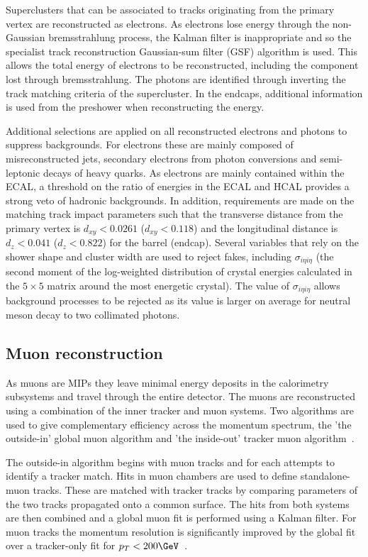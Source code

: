 Superclusters that can be associated to tracks originating from the primary vertex are reconstructed as electrons.
As electrons lose energy through the non-Gaussian bremsstrahlung process, the Kalman filter is inappropriate and
so the specialist track reconstruction Gaussian-sum filter (GSF) algorithm is used. This allows the total energy of
electrons to be reconstructed, including the component lost through bremsstrahlung. The photons are identified 
through inverting the track matching criteria of the supercluster. In the endcaps, additional information
is used from the preshower when reconstructing the energy.

Additional selections are applied on all reconstructed electrons and photons to suppress backgrounds.
For electrons these are mainly composed of misreconstructed jets, secondary electrons from photon
conversions and semi-leptonic decays of heavy quarks. As electrons are mainly contained within 
the ECAL, a threshold on the ratio of energies in the ECAL and HCAL provides a strong veto of hadronic
backgrounds. In addition, requirements are made on the matching track impact
parameters such that the transverse distance from the primary vertex is $d_{xy} < 0.0261$ ($d_{xy} < 0.118$) 
and the longitudinal distance is $d_z < 0.041$ ($d_z < 0.822$) for the barrel (endcap). 
Several variables that rely on the shower shape and cluster width are used to
reject fakes, including $\sigma_{i\eta i\eta}$ (the second moment of the log-weighted
distribution of crystal energies calculated in the $5\times5$ matrix around the
most energetic crystal). The value of $\sigma_{i\eta i\eta}$ allows background
processes to be rejected as its value is larger on average for neutral meson decay to two collimated photons.

\subsection{Muon reconstruction}
\label{sec:muon_reco}

As muons are MIPs they leave minimal energy deposits in the calorimetry
subsystems and travel through the entire detector. The muons are reconstructed using a 
combination of the inner tracker and muon systems. Two algorithms are used to 
give complementary efficiency across the momentum spectrum, the 'the outside-in' 
global muon algorithm and 'the inside-out' tracker muon algorithm~\cite{muon_reco}.

The outside-in algorithm begins with muon tracks and for each attempts to
identify a tracker match. Hits in muon chambers are used to define standalone-muon tracks. 
These are matched with tracker tracks by comparing parameters of the two tracks propagated 
onto a common surface. The hits from both systems are then combined and a global muon fit 
is performed using a Kalman filter. For muon tracks the momentum resolution is significantly improved by 
the global fit over a tracker-only fit for $p_T < 200\GeV$~\cite{CMS,muon_reco_cosmic}. 

